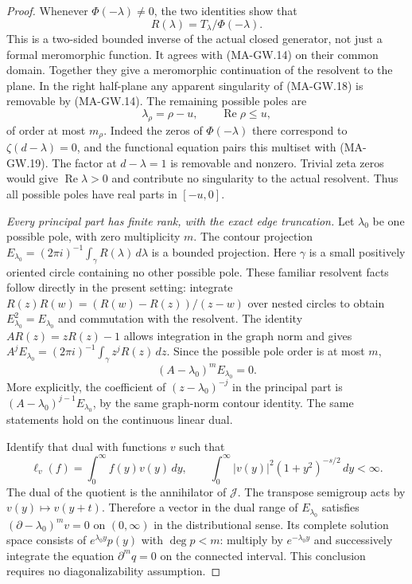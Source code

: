 \begin{proof}
Whenever $\Phi(-\lambda)\ne0$, the two identities show that
\[
                         R(\lambda)=T_\lambda/\Phi(-\lambda).
 \tag{MA-GW.18}
\]
This is a two-sided bounded inverse of the actual closed
generator, not just a formal meromorphic function.
It agrees with (MA-GW.14) on their common domain.
Together they give a meromorphic continuation of the
resolvent to the plane.  In the right half-plane any
apparent singularity of (MA-GW.18) is removable by
(MA-GW.14).  The remaining possible poles are
\[
                \lambda_\rho=\rho-u,\qquad
                \operatorname{Re}\rho\le u,
 \tag{MA-GW.19}
\]
of order at most $m_\rho$.
Indeed the zeros of $\Phi(-\lambda)$ there correspond
to $\zeta(d-\lambda)=0$, and the functional equation
pairs this multiset with (MA-GW.19).
The factor at $d-\lambda=1$ is removable and nonzero.
Trivial zeta zeros would give $\operatorname{Re}\lambda>0$
and contribute no singularity to the actual resolvent.
Thus all possible poles have real parts in $[-u,0]$.

\emph{Every principal part has finite rank, with the exact edge truncation.}
Let $\lambda_0$ be one possible pole, with zero multiplicity $m$.
The contour projection
$E_{\lambda_0}=(2\pi i)^{-1}\int_\gamma R(\lambda)\,d\lambda$
is a bounded projection.  Here $\gamma$ is a small
positively oriented circle containing no other possible pole.
These familiar resolvent facts follow directly in the present
setting: integrate
$R(z)R(w)=(R(w)-R(z))/(z-w)$ over nested circles to obtain
$E_{\lambda_0}^2=E_{\lambda_0}$ and commutation with the
resolvent.  The identity $AR(z)=zR(z)-1$ allows integration
in the graph norm and gives
$A^jE_{\lambda_0}=(2\pi i)^{-1}\int_\gamma z^jR(z)\,dz$.
Since the possible pole order is at most $m$,
\[
                  (A-\lambda_0)^mE_{\lambda_0}=0.
 \tag{MA-GW.20}
\]
More explicitly, the coefficient of
$(z-\lambda_0)^{-j}$ in the principal part is
$(A-\lambda_0)^{j-1}E_{\lambda_0}$, by the same
graph-norm contour identity.
The same statements hold on the continuous linear dual.

Identify that dual with functions $v$ such that
\[
       \ell_v(f)=\int_0^\infty f(y)v(y)\,dy,\qquad
       \int_0^\infty |v(y)|^2(1+y^2)^{-s/2}\,dy<\infty.
 \tag{MA-GW.21}
\]
The dual of the quotient is the annihilator of $\mathcal J$.
The transpose semigroup acts by $v(y)\mapsto v(y+t)$.
Therefore a vector in the dual range of $E_{\lambda_0}$
satisfies $(\partial-\lambda_0)^m v=0$ on $(0,\infty)$
in the distributional sense.
Its complete solution space consists of
$e^{\lambda_0y}p(y)$ with $\deg p<m$:
multiply by $e^{-\lambda_0y}$ and successively integrate
the equation $\partial^m q=0$ on the connected interval.
This conclusion requires no diagonalizability assumption.


\end{proof}
